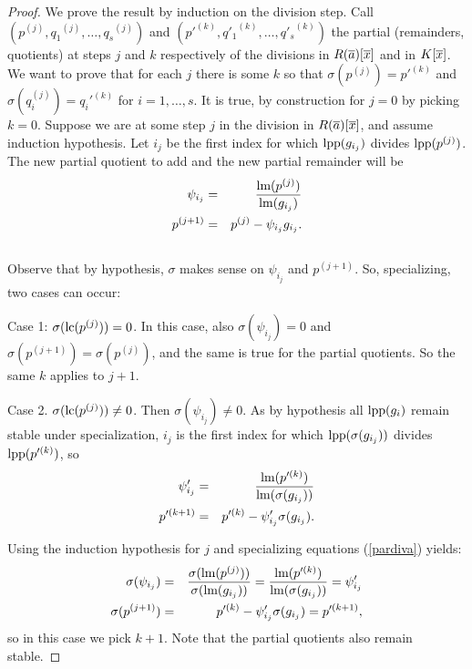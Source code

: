 \begin{proof}
 We prove the result by induction on the division
step. Call $(p^{(j)},{q_1}^{(j)},\dots,{q_s}^{(j)})$ and
$(p'^{(k)},{q'_1}^{(k)},\dots,{q'_s}^{(k)})$ the partial
(remainders, quotients) at steps $j$ and $k$ respectively of the
divisions in $R(\overline{a})[\overline{x}]$ and in $K[\overline{x}]$. We want to prove that
for each $j$ there is some $k$ so that $\sigma(p^{(j)})=p'^{(k)}$
and $\sigma(q_i^{(j)})=q_i'^{(k)}$ for $i=1,\dots,s$. It is true,
by construction for $j=0$ by picking $k=0$. Suppose we are at some
step $j$ in the division in $R(\overline{a})[\overline{x}]$, and assume induction
hypothesis. Let $i_j$ be the first index for which $\hbox{\rm lpp}(g_{i_j})$
divides $\hbox{\rm lpp}(p^{(j)})$. The new partial quotient to add and the
new partial remainder will be
\begin{eqnarray}
 \psi_{i_j} &=&
\frac{\hbox{\rm lm}(p^{(j)})}{\hbox{\rm lm}(g_{i_j})} \nonumber \\ p^{(j+1)} &=&
p^{(j)}-\psi_{i_j}g_{i_j}. \label{pardiva} \\ \nonumber
\end{eqnarray}
Observe that by hypothesis, $\sigma$ makes sense on $\psi_{i_j}$
and $p^{(j+1)}$. So, specializing, two cases can occur:

Case 1: $\sigma(\hbox{\rm lc}(p^{(j)}))=0$. In this case, also
$\sigma(\psi_{i_j})=0$ and $\sigma(p^{(j+1)})=\sigma(p^{(j)})$,
and the same is true for the partial quotients. So the same $k$
applies to $j+1$.

Case 2. $\sigma(\hbox{\rm lc}(p^{(j)})) \ne 0$. Then $\sigma(\psi_{i_j}) \ne
0$. As by hypothesis all $\hbox{\rm lpp}(g_i)$ remain stable under
specialization, $i_j$ is the first index for which
$\hbox{\rm lpp}(\sigma(g_{i_j}))$ divides $\hbox{\rm lpp}(p'^{(k)})$, so
\begin{eqnarray*}
\psi'_{i_j} &=& \frac{\hbox{\rm lm}(p'^{(k)})}{\hbox{\rm lm}(\sigma(g_{i_j}))}\\
p'^{(k+1)} &=& p'^{(k)}-\psi'_{i_j}\sigma(g_{i_j}).\\
\end{eqnarray*}


Using the induction hypothesis for $j$ and specializing equations
(\ref{pardiva}) yields:
\begin{eqnarray*}
\sigma(\psi_{i_j}) &=&
\frac{\sigma(\hbox{\rm lm}(p^{(j)}))}{\sigma(\hbox{\rm lm}(g_{i_j}))} =
\frac{\hbox{\rm lm}(p'^{(k)})}{\hbox{\rm lm}(\sigma(g_{i_j}))} = \psi'_{i_j}\\
\sigma(p^{(j+1)}) &=& p'^{(k)}-\psi'_{i_j}
\sigma(g_{i_j})=p'^{(k+1)},\\
\end{eqnarray*}
so in this case we pick $k+1$. Note that the partial quotients
also remain stable.
\end{proof}

